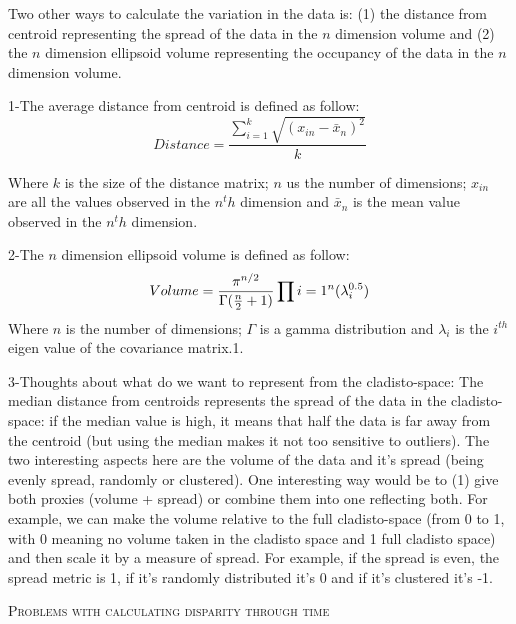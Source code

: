 \documentclass[12pt,letterpaper]{article}
\renewcommand{\section}[1]{%
\bigskip
\begin{center}
\begin{Large}
\normalfont\scshape #1
\medskip
\end{Large}
\end{center}}
\begin{document}
Two other ways to calculate the variation in the data is: (1) the distance from centroid \cite{finlay2015morphological} representing the spread of the data in the $n$ dimension volume and (2) the $n$ dimension ellipsoid volume \cite{DonohueDim} representing the occupancy of the data in the $n$ dimension volume.

1-The average distance from centroid is defined as follow:
\begin{equation}
Distance=\frac{{\sum\limits_{i=1}^k \sqrt{(x_{in}-\bar{x}_{n})^2}}}{k}
\end{equation}

Where $k$ is the size of the distance matrix; $n$ us the number of dimensions; $x_{in}$ are all the values observed in the $n^th$ dimension and $\bar{x}_{n}$ is the mean value observed in the $n^th$ dimension.

2-The $n$ dimension ellipsoid volume is defined as follow:
\begin{equation}
Volume={{\pi^{n/2}} \over {\Gamma({n\over2}+1)}}\prod\limits{i=1}^n(\lambda_{i}^{0.5})
\end{equation}
Where $n$ is the number of dimensions; $\Gamma$ is a gamma distribution and $\lambda_i$ is the $i^{th}$ eigen value of the covariance matrix.1.


3-Thoughts about what do we want to represent from the cladisto-space:
The median distance from centroids represents the spread of the data in the cladisto-space: if the median value is high, it means that half the data is far away from the centroid (but using the median makes it not too sensitive to outliers).
The two interesting aspects here are the volume of the data and it's spread (being evenly spread, randomly or clustered).
One interesting way would be to (1) give both proxies (volume + spread) or combine them into one reflecting both.
For example, we can make the volume relative to the full cladisto-space (from 0 to 1, with 0 meaning no volume taken in the cladisto space and 1 full cladisto space) and then scale it by a measure of spread.
For example, if the spread is even, the spread metric is 1, if it's randomly distributed it's 0 and if it's clustered it's -1.

\section{Problems with calculating disparity through time}
\end{document}
